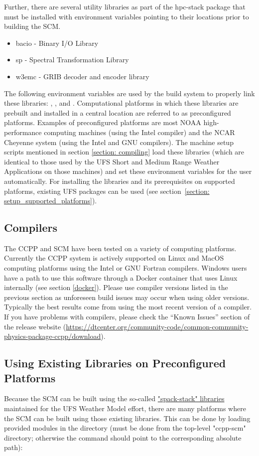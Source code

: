 Further, there are several utility libraries as part of the hpc-stack package that must be installed with environment variables pointing to their locations prior to building the SCM.
\begin{itemize}
    \item bacio - Binary I/O Library
    \item sp - Spectral Transformation Library
    \item w3emc - GRIB decoder and encoder library
\end{itemize}
The following environment variables are used by the build system to properly link these libraries: , , and . Computational platforms in which these libraries are prebuilt and installed in a central location are referred to as preconfigured platforms. Examples of preconfigured platforms are most NOAA high-performance computing machines (using the Intel compiler) and the NCAR Cheyenne system (using the Intel and GNU compilers). The machine setup scripts mentioned in section \ref{section: compiling} load these libraries (which are identical to those used by the UFS Short and Medium Range Weather Applications on those machines) and set these environment variables for the user automatically. For installing the libraries and its prerequisites on supported platforms, existing UFS packages can be used (see section~\ref{section: setup_supported_platforms}).

\subsection{Compilers}
The CCPP and SCM have been tested on a variety of
computing platforms. Currently the CCPP system is actively supported
on Linux and MacOS computing platforms using the Intel or GNU Fortran
compilers. Windows users have a path to use this software through a Docker container that uses Linux internally (see section \ref{docker}). Please use compiler versions listed in the previous section as unforeseen
build issues may occur when using older versions. Typically the best results come from using the
most recent version of a compiler. If you have problems with compilers, please check the ``Known Issues'' section of the
release website (\url{https://dtcenter.org/community-code/common-community-physics-package-ccpp/download}).

\subsection{Using Existing Libraries on Preconfigured Platforms}\label{section: use_preconfigured_platforms}
Because the SCM can be built using the so-called \href{https://ufs-weather-model.readthedocs.io/en/latest/Glossary.html#term-spack-stack}{"spack-stack" libraries} maintained for the UFS Weather Model effort, there are many platforms where the SCM can be built using those existing libraries. This can be done by loading provided modules in the  directory (must be done from the top-level "ccpp-scm" directory; otherwise the  command should point to the corresponding absolute path):

